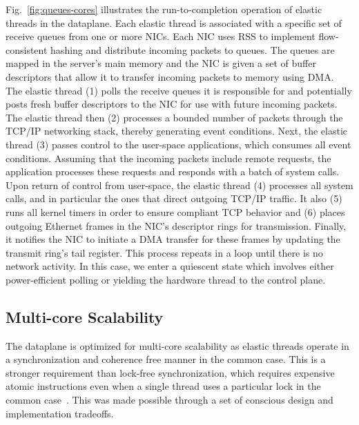  

Fig.~\ref{fig:queues-cores} illustrates the run-to-completion
operation of elastic threads in the \ix dataplane. Each elastic thread
is associated with a specific set of receive queues from one or more
NICs. Each NIC uses RSS to implement flow-consistent hashing and
distribute incoming packets to queues. The queues are mapped in the
server's main memory and the NIC is given a set of buffer descriptors
that allow it to transfer incoming packets to memory using DMA\@.  The
elastic thread (1) polls the receive queues it is responsible for and
potentially posts fresh buffer descriptors to the NIC for use with
future incoming packets. The elastic thread then (2) processes a bounded
number of packets through the TCP/IP networking stack, thereby
generating event conditions. Next, the elastic thread (3) passes
control to the user-space applications, which consumes all event
conditions. Assuming that the incoming packets include remote
requests, the application processes these requests and responds with a
batch of system calls. Upon return of control from user-space, the
elastic thread (4) processes all system calls, and in particular the
ones that direct outgoing TCP/IP traffic. It also (5) runs all kernel
timers in order to ensure compliant TCP behavior and (6) places
outgoing Ethernet frames in the NIC's descriptor rings for
transmission. Finally, it notifies the NIC to initiate a DMA transfer
for these frames by updating the transmit ring's tail register.  This
process repeats in a loop until there is no network activity. In this
case, we enter a quiescent state which involves either power-efficient
polling or yielding the hardware thread  to the control plane.



\subsection{Multi-core Scalability}
\label{sec:impl:cohfree}

The \ix dataplane is optimized for multi-core scalability as elastic
threads operate in a synchronization and coherence free manner in the
common case. This is a stronger requirement than lock-free
synchronization, which requires expensive atomic instructions even
when a single thread uses a particular lock in the common
case~\cite{DBLP:conf/sosp/DavidGT13}.  This was made possible 
through a set of conscious design and implementation tradeoffs. 

